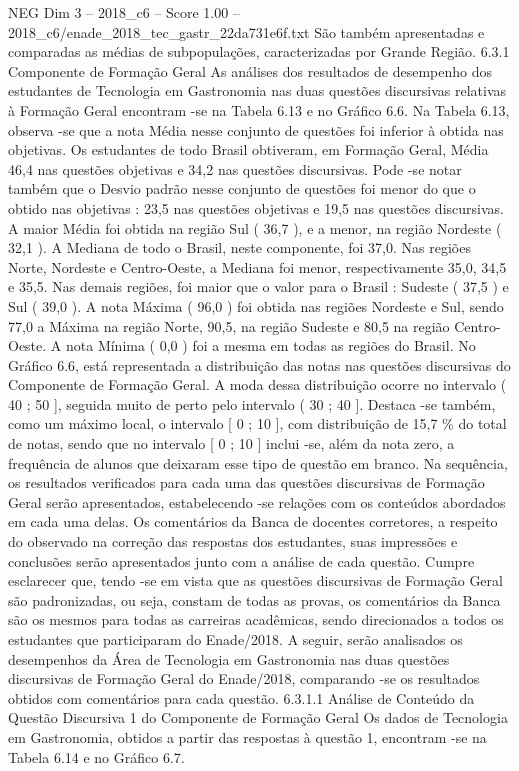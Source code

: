 \begin{textsample}{NEG Dim 3 – 2018\_c6 – Score 1.00 – 2018\_c6/enade\_2018\_tec\_gastr\_22da731e6f.txt}
São também apresentadas e comparadas as médias de subpopulações, caracterizadas por Grande Região. 6.3.1 Componente de Formação Geral As análises dos resultados de desempenho dos estudantes de Tecnologia em Gastronomia nas duas questões discursivas relativas à Formação Geral encontram -se na Tabela 6.13 e no Gráfico 6.6.
Na Tabela 6.13, observa -se que a nota Média nesse conjunto de questões foi inferior à obtida nas objetivas.
Os estudantes de todo Brasil obtiveram, em Formação Geral, Média 46,4 nas questões objetivas e 34,2 nas questões discursivas.
Pode -se notar também que o Desvio padrão nesse conjunto de questões foi menor do que o obtido nas objetivas : 23,5 nas questões objetivas e 19,5 nas questões discursivas.
A maior Média foi obtida na região Sul ( 36,7 ), e a menor, na região Nordeste ( 32,1 ).
A Mediana de todo o Brasil, neste componente, foi 37,0.
Nas regiões Norte, Nordeste e Centro-Oeste, a Mediana foi menor, respectivamente 35,0, 34,5 e 35,5.
Nas demais regiões, foi maior que o valor para o Brasil : Sudeste ( 37,5 ) e Sul ( 39,0 ).
A nota Máxima ( 96,0 ) foi obtida nas regiões Nordeste e Sul, sendo 77,0 a Máxima na região Norte, 90,5, na região Sudeste e 80,5 na região Centro-Oeste.
A nota Mínima ( 0,0 ) foi a mesma em todas as regiões do Brasil.
No Gráfico 6.6, está representada a distribuição das notas nas questões discursivas do Componente de Formação Geral.
A moda dessa distribuição ocorre no intervalo ( 40 ; 50 ], seguida muito de perto pelo intervalo ( 30 ; 40 ].
Destaca -se também, como um máximo local, o intervalo [ 0 ; 10 ], com distribuição de 15,7 \% do total de notas, sendo que no intervalo [ 0 ; 10 ] inclui -se, além da nota zero, a frequência de alunos que deixaram esse tipo de questão em branco.
Na sequência, os resultados verificados para cada uma das questões discursivas de Formação Geral serão apresentados, estabelecendo -se relações com os conteúdos abordados em cada uma delas.
Os comentários da Banca de docentes corretores, a respeito do observado na correção das respostas dos estudantes, suas impressões e conclusões serão apresentados junto com a análise de cada questão.
Cumpre esclarecer que, tendo -se em vista que as questões discursivas de Formação Geral são padronizadas, ou seja, constam de todas as provas, os comentários da Banca são os mesmos para todas as carreiras acadêmicas, sendo direcionados a todos os estudantes que participaram do Enade/2018.
A seguir, serão analisados os desempenhos da Área de Tecnologia em Gastronomia nas duas questões discursivas de Formação Geral do Enade/2018, comparando -se os resultados obtidos com comentários para cada questão. 6.3.1.1 Análise de Conteúdo da Questão Discursiva 1 do Componente de Formação Geral Os dados de Tecnologia em Gastronomia, obtidos a partir das respostas à questão 1, encontram -se na Tabela 6.14 e no Gráfico 6.7.

\end{textsample}
